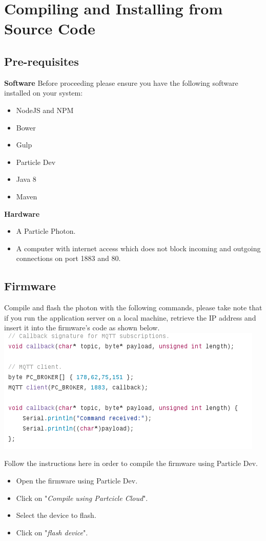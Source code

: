 \documentclass[a4paper,10pt]{article}
\begin{document}
	\section{Compiling and Installing from Source Code}
	\subsection{Pre-requisites}
	\textbf{Software}
	Before proceeding please ensure you have the following software installed on your system:
	\begin{itemize}
		\item NodeJS and NPM
		\item Bower
		\item Gulp
		\item Particle Dev
		\item Java 8
		\item Maven
	\end{itemize}
	
	\textbf{Hardware}
	\begin{itemize}
		\item A Particle Photon.
		\item A computer with internet access which does not block incoming and outgoing connections on port 1883 and 80.
	\end{itemize}
	
	\subsection{Firmware}
	Compile and flash the photon with the following commands, please take note 
	that if you run the application server on a local machine, retrieve the IP 
	address and insert it into the firmware's code as shown below.\\
	
	\includegraphics[scale=0.5]{images/firmware.png}
	
	Follow the instructions here in order to compile the firmware using Particle 
	Dev.
	\\
	\begin{itemize}
		\item Open the firmware using Particle Dev.
		\item Click on "\textit{Compile using Partcicle Cloud}".
		\item Select the device to flash.
		\item Click on "\textit{flash device}".
	\end{itemize}
	
\end{document}

